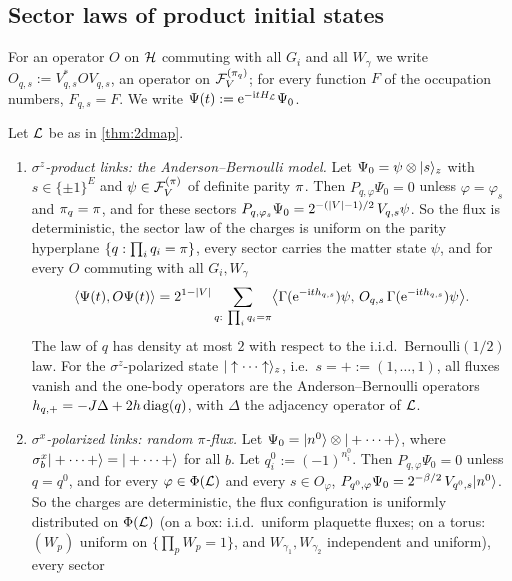 \subsection{Sector laws of product initial states}\label{sec:2d:laws}

For an operator $O$ on $\mathcal{H}$ commuting with all $G_i$ and all $W_\gamma$ we write
$O_{q,s}:=V_{q,s}^*OV_{q,s}$, an operator on $\mathcal{F}_V^{(\pi_q)}$; for every function $F$ of the occupation
numbers, $F_{q,s}=F$.  We write $\Psi(t):=\mathrm{e}^{-\mathrm{i} tH_{\mathcal{L}}}\Psi_0$.

\begin{proposition}\label{prop:2dlaws}
Let $\mathcal{L}$ be as in \cref{thm:2dmap}.
\begin{enumerate}[label=(\alph*)]
\item \emph{$\sigma^z$-product links: the Anderson--Bernoulli model.}  Let $\Psi_0=\psi\otimes|s\rangle_z$ with
$s\in\{\pm1\}^E$ and $\psi\in\mathcal{F}_V^{(\pi)}$ of definite parity $\pi$.  Then $P_{q,\varphi}\Psi_0=0$ unless
$\varphi=\varphi_s$ and $\pi_q=\pi$, and for these sectors $P_{q,\varphi_s}\Psi_0=2^{-(\left|V\right|-1)/2}\,V_{q,s}\psi$.  So the
flux is deterministic, the sector law of the charges is uniform on the parity hyperplane $\{q:\prod_iq_i=\pi\}$,
every sector carries the matter state $\psi$, and for every $O$ commuting with all $G_i,W_\gamma$
\begin{equation}\label{eq:2dlawz}
  \langle\Psi(t),O\Psi(t)\rangle=2^{1-\left|V\right|}\sum_{q:\ \prod_iq_i=\pi}
  \bigl\langle\Gamma(\mathrm{e}^{-\mathrm{i} th_{q,s}})\psi,\,O_{q,s}\,\Gamma(\mathrm{e}^{-\mathrm{i} th_{q,s}})\psi\bigr\rangle .
\end{equation}
The law of $q$ has density at most $2$ with respect to the i.i.d.\ Bernoulli$(1/2)$ law.  For the
$\sigma^z$-polarized state $|\uparrow\cdots\uparrow\rangle_z$, i.e.\ $s=+:=(1,\dots,1)$, all fluxes vanish and the
one-body operators are the Anderson--Bernoulli operators $h_{q,+}=-J\Delta+2h\operatorname{diag}(q)$, with $\Delta$ the adjacency
operator of $\mathcal{L}$.
\item \emph{$\sigma^x$-polarized links: random $\pi$-flux.}  Let $\Psi_0=|n^0\rangle\otimes|+\cdots+\rangle$, where
$\sigma^x_b|+\cdots+\rangle=|+\cdots+\rangle$ for all $b$.  Let $q^0_i:=(-1)^{n^0_i}$.  Then $P_{q,\varphi}\Psi_0=0$
unless $q=q^0$, and for every $\varphi\in\Phi(\mathcal{L})$ and every $s\in O_\varphi$,
$P_{q^0,\varphi}\Psi_0=2^{-\beta/2}\,V_{q^0,s}|n^0\rangle$.  So the charges are deterministic, the flux
configuration is uniformly distributed on $\Phi(\mathcal{L})$ (on a box: i.i.d.\ uniform plaquette fluxes; on a
torus: $(W_p)$ uniform on $\{\prod_pW_p=1\}$, and $W_{\gamma_1},W_{\gamma_2}$ independent and uniform), every sector

\end{enumerate}
\end{proposition}

